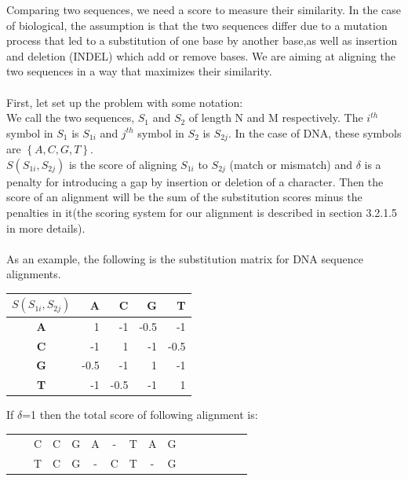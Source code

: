 \documentclass[11pt,a4paper]{report}
\begin{document}
Comparing two sequences, we need a score to measure their similarity.
In the case of biological, the assumption is that the two sequences differ
due to a mutation process that led to a substitution 
of one base by another base,as well as insertion and deletion (INDEL) which add or remove bases.
We are aiming at aligning the two sequences in a way that maximizes their similarity.\\ \\
First, let set up the problem with some notation:\\
We call the two sequences, $S_{1}$ and $S_{2}$ of length N and M respectively. 
The $i^{th}$ symbol in $S_{1}$ is $S_{1i}$ and $j^{th}$ symbol in $S_{2}$ is $S_{2j}$. 
In the case of DNA, these symbols are $\left\{A, C, G, T\right\}$.\\
$S(S_{1i}, S_{2j})$ is the score of aligning $S_{1i}$ to $S_{2j}$ (match or mismatch)
and $\delta$ is a penalty for introducing a gap by insertion or deletion of a character. 
Then the score of an alignment will be the sum of the substitution scores minus the 
penalties in it(the scoring system for our alignment is described in section 3.2.1.5 in more details).\\\\
As an example, the following is the substitution matrix for DNA sequence alignments.


\begin{table}[H]
 \centering
  \begin{tabular}{  c| r  r r  r }
    
  \textbf{  $S(S_{1i}, S_{2j})$ } & \textbf{A} &\textbf{ C} &\textbf{ G} &\textbf{ T} \\ \hline
       \textbf{A} &  1  & -1 & -0.5 & -1 \\
       \textbf{C} & -1  & 1 & -1 & -0.5 \\ 
       \textbf{G} & -0.5 & -1 & 1 & -1 \\ 
       \textbf{T} & -1 & -0.5 & -1 & 1
    \end{tabular}
\label{alignment-exp}
\end{table}

If $\delta$=1 then the total score of following alignment is:
 
\begin{center}
	\begin{tabular}{c *{12}cccc}
        & & C & C & G & A & - & T & A & G && \\
 	  & & T  & C & G &  -  & C   &  T & -  & G & \\
    	                                 
	\end{tabular}
\end{center} 
\end{document}
